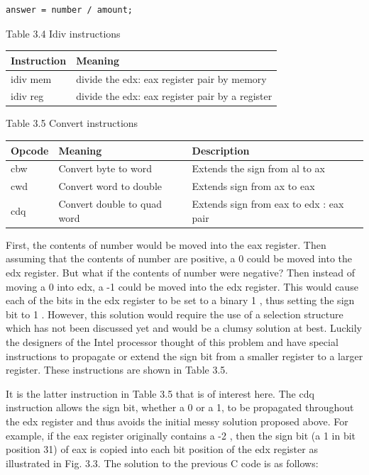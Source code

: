 \documentclass[10pt]{article}
\begin{document}
\begin{verbatim}
answer = number / amount;
\end{verbatim}

Table 3.4 Idiv instructions

\begin{center}
\begin{tabular}{|l|l|}
\hline
Instruction & Meaning \\
\hline
idiv mem & divide the edx: eax register pair by memory \\
\hline
idiv reg & divide the edx: eax register pair by a register \\
\hline
\end{tabular}
\end{center}

Table 3.5 Convert instructions

\begin{center}
\begin{tabular}{|l|l|l|}
\hline
Opcode & Meaning & Description \\
\hline
cbw & Convert byte to word & Extends the sign from al to ax \\
\hline
cwd & Convert word to double & Extends sign from ax to eax \\
\hline
cdq & Convert double to quad word & Extends sign from eax to edx : eax pair \\
\hline
\end{tabular}
\end{center}

First, the contents of number would be moved into the eax register. Then assuming that the contents of number are positive, a 0 could be moved into the edx register. But what if the contents of number were negative? Then instead of moving a 0 into edx, a -1 could be moved into the edx register. This would cause each of the bits in the edx register to be set to a binary 1 , thus setting the sign bit to 1 . However, this solution would require the use of a selection structure which has not been discussed yet and would be a clumsy solution at best. Luckily the designers of the Intel processor thought of this problem and have special instructions to propagate or extend the sign bit from a smaller register to a larger register. These instructions are shown in Table 3.5.

It is the latter instruction in Table 3.5 that is of interest here. The cdq instruction allows the sign bit, whether a 0 or a 1, to be propagated throughout the edx register and thus avoids the initial messy solution proposed above. For example, if the eax register originally contains a -2 , then the sign bit (a 1 in bit position 31) of eax is copied into each bit position of the edx register as illustrated in Fig. 3.3. The solution to the previous C code is as follows:
\end{document}
